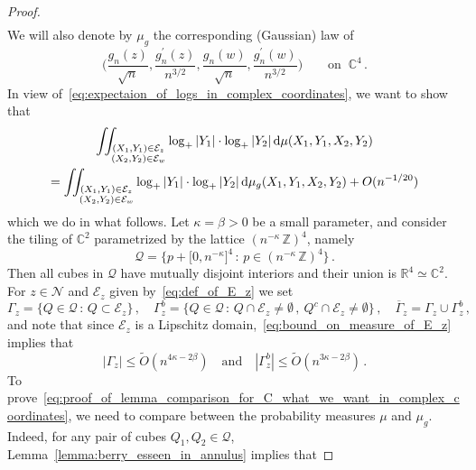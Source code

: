 \documentclass[11pt]{amsart}
\theoremstyle{remark}
\theoremstyle{definition}
\def\Ga{{\Gamma}}
\newcommand{\bR}{\mathbb R}
\newcommand{\bC}{\mathbb C}
\newcommand{\bZ}{\mathbb Z}
\newcommand{\cE}{\mathcal{E}}
\newcommand{\cN}{\mathcal N}
\begin{document}
\begin{proof}
\begin{multline}
        \end{multline}
        We will also denote by $\mu_g$ the corresponding (Gaussian) law of 
        \[
        \Big(\frac{g_n(z)}{\sqrt{n}},\frac{g_n^\prime(z)}{n^{3/2}},\frac{g_n(w)}{\sqrt{n}},\frac{g_n^\prime(w)}{n^{3/2}}\Big) \qquad \text{on }  \ \bC^4 \, . 
        \]
        In view of~\eqref{eq:expectaion_of_logs_in_complex_coordinates}, we want to show that 
        \begin{multline}
        \label{eq:proof_of_lemma_comparison_for_C_what_we_want_in_complex_coordinates}
            \iint_{\substack{  (X_1,Y_1)\in \cE_z \\  (X_2,Y_2)\in \cE_w }} \log_+|Y_1| \cdot \log_+|Y_2| \, {\rm d}\mu(X_1,Y_1,X_2,Y_2) \\ = \iint_{\substack{  (X_1,Y_1)\in \cE_z \\  (X_2,Y_2)\in \cE_w }} \log_+|Y_1| \cdot \log_+|Y_2| \, {\rm d}\mu_g(X_1,Y_1,X_2,Y_2) + O(n^{-1/20})
        \end{multline}
        which we do in what follows. Let $\kappa=\beta>0$ be a small parameter, and consider the tiling of $\bC^2$ parametrized by the lattice $(n^{-\kappa} 
 \, \bZ)^4$, namely
        \begin{equation*}
            \mathcal{Q} = \Big\{ p + \big[0,n^{-\kappa}]^{4} \, : \, p\in (n^{-\kappa} \, \bZ)^4 \Big\} \, .
        \end{equation*}
        Then all cubes in $\mathcal{Q}$ have mutually disjoint interiors and their union is $\bR^4 \simeq \bC^2$.  For $z\in \cN$ and $\cE_z$ given by~\eqref{eq:def_of_E_z} we set 
        \begin{equation*}
            \Gamma_z = \big\{ Q\in \mathcal{Q} \, : \, Q\subset \cE_z\big\} \, , \quad 
            \Gamma_z^{b} = \big\{ Q\in \mathcal{Q} \, : \, Q\cap \cE_z \not = \emptyset \, , \ Q^c\cap \cE_z \not=\emptyset \big\}  \, , \quad   \overline \Ga_z = \Ga_z \cup \Ga_z^b \, , 
        \end{equation*}
        and note that since $\cE_z$ is a Lipschitz domain,~\eqref{eq:bound_on_measure_of_E_z} implies that 
        \begin{equation}
        \label{eq:bound_on_caridinality_of_Gamma}
            |\Ga_z| \le \widetilde{O}(n^{4\kappa - 2\beta}) \quad \text{and} \quad |\Ga_z^b| \le  \widetilde{O}(n^{3\kappa-2\beta}) \, .
        \end{equation}                
        To prove~\eqref{eq:proof_of_lemma_comparison_for_C_what_we_want_in_complex_coordinates}, we need to compare between the probability measures $\mu$ and $\mu_g$. Indeed, for any pair of cubes $Q_1,Q_2\in \mathcal{Q}$, Lemma~\ref{lemma:berry_esseen_in_annulus} implies that

\end{proof}
\end{document}
